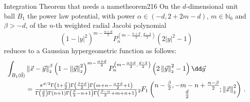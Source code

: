 \begin{theorem}{Integration Theorem that needs a name}{theorem216}
  On the $d$-dimensional unit ball $B_1$ the power law potential, with power $\alpha \in(-d,2+2m-d)$, $m\in\mathbb{N}_0$ and $\beta>-d$, of the $n$-th weighted radial Jacobi polynomial $$(1-|y|^2)^{m-\frac{\alpha+d}{2}}P_n^{\left(m-\frac{\alpha+d}{2},\frac{d-2}{2}\right)}(2|y|^2-1)$$ reduces to a Gaussian hypergeometric function as follows:
  \begin{align*}
    \int_{B_1(\vec{0})} & \norm{\vec{x}-\vec{y}}^\beta \left(1-\norm{\vec{y}}^2\right)^{m-\frac{\alpha+d}{2}} P_{n}^{\left(m-\frac{\alpha+d}{2},\frac{d-2}{2}\right)}\left(\jacobiarg{y}\right) \dd\vec{y}                                                                                                                                                                                                                                   \\
                        & = \tfrac{\pi ^{d/2} \Gamma \left(1+\frac{\beta}{2}\right) \Gamma \left(\frac{\beta+d}{2}\right) \Gamma \left(m+n-\frac{\alpha+d}{2}+1\right)}{\Gamma \left(\frac{d}{2}\right) \Gamma (n+1) \Gamma \left(\frac{\beta}{2}-n+1\right) \Gamma \left(\frac{\beta-\alpha}{2}+m+n+1\right)}{}_2F_1\left(\begin{matrix}n-\frac{\beta}{2}, -m-n+\frac{\alpha-\beta}{2} \\\frac{d}{2}\end{matrix};\norm{\vec{x}}^2\right)\,.
  \end{align*}
\end{theorem}

